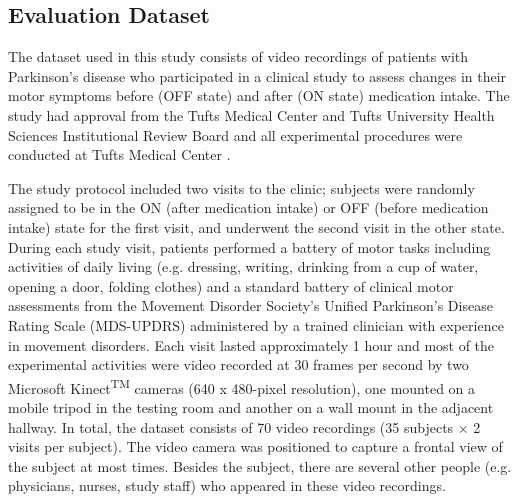 
\subsection{Evaluation Dataset} \label{sec:dataset}
The dataset used in this study consists of video recordings of patients with Parkinson's disease who participated in a clinical study to assess changes in their motor symptoms before (OFF state) and after (ON state) medication intake. The study had approval from the Tufts Medical Center and Tufts University Health Sciences Institutional Review Board and all experimental procedures were conducted at Tufts Medical Center \cite{erb2018bluesky}.

The study protocol included two visits to the clinic; subjects were randomly assigned to be in the ON (after medication intake) or OFF (before medication intake) state for the first visit, and underwent the second visit in the other state. During each study visit, patients performed a battery of motor tasks including activities of daily living (e.g. dressing, writing, drinking from a cup of water, opening a door, folding clothes) and a standard battery of clinical motor assessments from the Movement Disorder Society's Unified Parkinson's Disease Rating Scale (MDS-UPDRS) \cite{goetz2008movement} administered by a trained clinician with experience in movement disorders. Each visit lasted approximately 1 hour and most of the experimental activities were video recorded at 30 frames per second by two Microsoft Kinect\textsuperscript{TM} cameras (640 x 480-pixel resolution), one mounted on a mobile tripod in the testing room and another on a wall mount in the adjacent hallway. In total, the dataset consists of 70 video recordings (35 subjects $\times$ 2 visits per subject). The video camera was positioned to capture a frontal view of the subject at most times. Besides the subject, there are several other people (e.g. physicians, nurses, study staff) who appeared in these video recordings.

